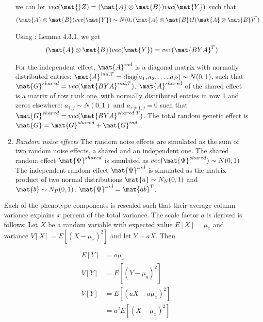 \begin{enumerate}
we can let  \(vec(\mat{}Z) =  (\mat{A} \otimes \mat{B})vec(\mat{Y})\) such that
\begin{equation}
\begin{aligned}
(\mat{A} \otimes\mat{B})vec(\mat{Y})  \sim N(0, (\mat{A} \otimes \mat{B}) I (\mat{A} \otimes \mat{B})^T) 
\end{aligned}
\end{equation}

Using \citep{Horn1991}: Lemma 4.3.1, we get 
\begin{equation}
(\mat{A} \otimes \mat{B}) vec(\mat{Y}) = vec(\mat{BYA}^T) 
\end{equation}

For the independent effect, \(\mat{A}^{ind}\) is a diagonal matrix with normally distributed entries: \(\mat{A}^{ind, T} = \text{diag}(a_1, a_2,  \dotsc , a_P) \sim N(0, 1)\), such that \(\mat{G}^{shared} =  vec(\mat{BYA}^{ind, T}) \). \(\mat{A}^{shared}\) of the shared effect is a matrix of row rank one, with normally distributed entries in row 1 and zeros elsewhere: \(a_{1,j} \sim N(0,1)\) and \(a_{i \neq 1,j} = 0\) such that \(\mat{G}^{shared} =  vec(\mat{BYA}^{shared, T}) \). The total random genetic effect  is \(\mat{G} = \mat{G}^{shared} + \mat{G}^{ind}\). 

\item \textit{Random noise effects} The random noise effects \tmat{\Psi} are simulated as the sum of two random noise effects, a shared and an independent one. The shared random effect \(\mat{\Psi}^{shared}\) is simulated as \(vec(\mat{\Psi}^{shared}) \sim N(0, 1)\) The independent random effect \(\mat{\Psi}^{ind}\) is simulated as the matrix product of two normal distributions \(\mat{a} \sim N_N(0, 1)\) and \(\mat{b} \sim N_P(0, 1)\): \(\mat{\Psi}^{ind} = \mat{ab}^T\).
\end{enumerate}

Each of the phenotype components is rescaled such that their average column variance explains \(x\) percent of the total variance. The scale factor \(a\) is derived is follows: 
Let \(X\) be a random variable with expected value \(E[X] = \mu_{x}\) and variance \(V[X] = E[(X - \mu_{x})^2]\) and let  \(Y = aX\). Then
  
\begin{equation}
\begin{aligned}
E[Y] &= a\mu_{x} \\
V[Y] &= E[(Y - \mu_{y})^2] \\
V[Y] &= E[(aX - a\mu_{x})^2] \\
		&= a^2 E[(X - \mu_{x})^2] \\
\end{aligned}
\end{equation}

